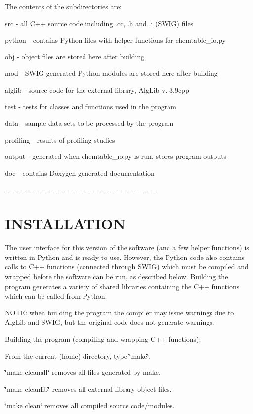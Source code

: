 The contents of the subdirectories are:
\begin{DoxyItemize}
\item src -\/ all C++ source code including .cc, .h and .i (SWIG) files
\item python -\/ contains Python files with helper functions for chemtable\_\-io.py
\item obj -\/ object files are stored here after building
\item mod -\/ SWIG-\/generated Python modules are stored here after building
\item alglib -\/ source code for the external library, AlgLib v. 3.9cpp
\item test -\/ tests for classes and functions used in the program
\item data -\/ sample data sets to be processed by the program
\item profiling -\/ results of profiling studies
\item output -\/ generated when chemtable\_\-io.py is run, stores program outputs
\item doc -\/ contains Doxygen generated documentation
\end{DoxyItemize}

-\/-\/-\/-\/-\/-\/-\/-\/-\/-\/-\/-\/-\/-\/-\/-\/-\/-\/-\/-\/-\/-\/-\/-\/-\/-\/-\/-\/-\/-\/-\/-\/-\/-\/-\/-\/-\/-\/-\/-\/-\/-\/-\/-\/-\/-\/-\/-\/-\/-\/-\/-\/-\/-\/-\/-\/-\/-\/-\/-\/-\/-\/-\/-\/-\/-\/\hypertarget{index__3_}{}\section{INSTALLATION}\label{index__3_}
The user interface for this version of the software (and a few helper functions) is written in Python and is ready to use. However, the Python code also contains calls to C++ functions (connected through SWIG) which must be compiled and wrapped before the software can be run, as described below. Building the program generates a variety of shared libraries containing the C++ functions which can be called from Python.

NOTE: when building the program the compiler may issue warnings due to AlgLib and SWIG, but the original code does not generate warnings.

Building the program (compiling and wrapping C++ functions):
\begin{DoxyItemize}
\item From the current (home) directory, type \char`\"{}make\char`\"{}.
\item \char`\"{}make cleanall\char`\"{} removes all files generated by make.
\item \char`\"{}make cleanlib\char`\"{} removes all external library object files.
\item \char`\"{}make clean\char`\"{} removes all compiled source code/modules.
\end{DoxyItemize}

